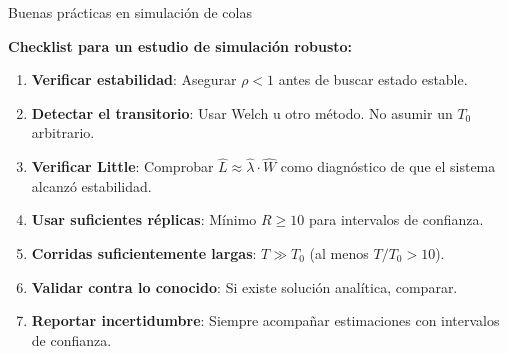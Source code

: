 \documentclass[aspectratio=1610, 9pt]{beamer}
\begin{document}
\begin{frame}{Buenas prácticas en simulación de colas}

\textbf{Checklist para un estudio de simulación robusto:}

\vspace{0.3cm}
\begin{enumerate}
    \item \textbf{Verificar estabilidad}: Asegurar $\rho < 1$ antes de buscar estado estable.
    
    \vspace{0.15cm}
    \item \textbf{Detectar el transitorio}: Usar Welch u otro método. No asumir un $T_0$ arbitrario.
    
    \vspace{0.15cm}
    \item \textbf{Verificar Little}: Comprobar $\hat{L} \approx \hat{\lambda}\cdot\hat{W}$ como diagnóstico de que el sistema alcanzó estabilidad.
    
    \vspace{0.15cm}
    \item \textbf{Usar suficientes réplicas}: Mínimo $R \geq 10$ para intervalos de confianza.
    
    \vspace{0.15cm}
    \item \textbf{Corridas suficientemente largas}: $T \gg T_0$ (al menos $T/T_0 > 10$).
    
    \vspace{0.15cm}
    \item \textbf{Validar contra lo conocido}: Si existe solución analítica, comparar.
    
    \vspace{0.15cm}
    \item \textbf{Reportar incertidumbre}: Siempre acompañar estimaciones con intervalos de confianza.
\end{enumerate}
\end{frame}
\end{document}
